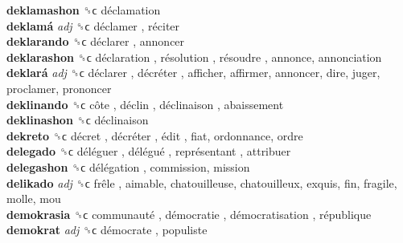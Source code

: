 \textbf{deklamashon} ␝ϲ   déclamation   \\
\textbf{deklamá} \emph{adj}  ␝ϲ   déclamer ,  réciter   \\
\textbf{deklarando} ␝ϲ   déclarer , annoncer  \\
\textbf{deklarashon} ␝ϲ   déclaration ,  résolution ,  résoudre , annonce, annonciation  \\
\textbf{deklará} \emph{adj}  ␝ϲ   déclarer ,  décréter , afficher, affirmer, annoncer, dire, juger, proclamer, prononcer  \\
\textbf{deklinando} ␝ϲ   côte ,  déclin ,  déclinaison , abaissement  \\
\textbf{deklinashon} ␝ϲ   déclinaison   \\
\textbf{dekreto} ␝ϲ   décret ,  décréter ,  édit , fiat, ordonnance, ordre  \\
\textbf{delegado} ␝ϲ   déléguer ,  délégué ,  représentant , attribuer  \\
\textbf{delegashon} ␝ϲ   délégation , commission, mission  \\
\textbf{delikado} \emph{adj}  ␝ϲ   frêle , aimable, chatouilleuse, chatouilleux, exquis, fin, fragile, molle, mou  \\
\textbf{demokrasia} ␝ϲ   communauté ,  démocratie ,  démocratisation ,  république   \\
\textbf{demokrat} \emph{adj}  ␝ϲ   démocrate , populiste  \\
